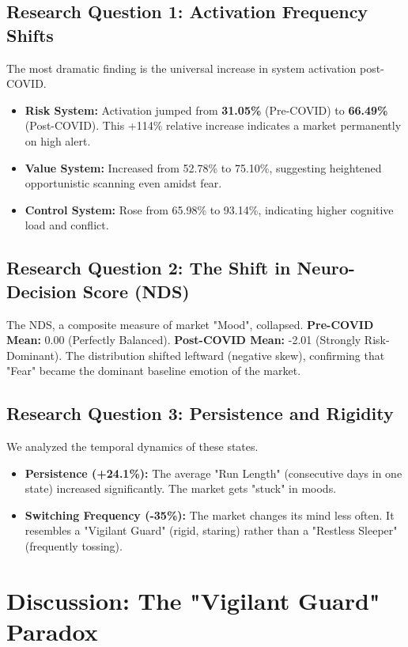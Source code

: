 \documentclass[12pt, oneside]{article}
\begin{document}
\subsection{Research Question 1: Activation Frequency Shifts}
The most dramatic finding is the universal increase in system activation post-COVID.
\begin{itemize}
    \item \textbf{Risk System:} Activation jumped from \textbf{31.05\%} (Pre-COVID) to \textbf{66.49\%} (Post-COVID). This +114\% relative increase indicates a market permanently on high alert.
    \item \textbf{Value System:} Increased from 52.78\% to 75.10\%, suggesting heightened opportunistic scanning even amidst fear.
    \item \textbf{Control System:} Rose from 65.98\% to 93.14\%, indicating higher cognitive load and conflict.
\end{itemize}

\subsection{Research Question 2: The Shift in Neuro-Decision Score (NDS)}
The NDS, a composite measure of market "Mood", collapsed.
\textbf{Pre-COVID Mean:} 0.00 (Perfectly Balanced).
\textbf{Post-COVID Mean:} -2.01 (Strongly Risk-Dominant).
The distribution shifted leftward (negative skew), confirming that "Fear" became the dominant baseline emotion of the market.

\subsection{Research Question 3: Persistence and Rigidity}
We analyzed the temporal dynamics of these states.
\begin{itemize}
    \item \textbf{Persistence (+24.1\%):} The average "Run Length" (consecutive days in one state) increased significantly. The market gets "stuck" in moods.
    \item \textbf{Switching Frequency (-35\%):} The market changes its mind less often. It resembles a "Vigilant Guard" (rigid, staring) rather than a "Restless Sleeper" (frequently tossing).
\end{itemize}

\section{Discussion: The "Vigilant Guard" Paradox}
\end{document}
